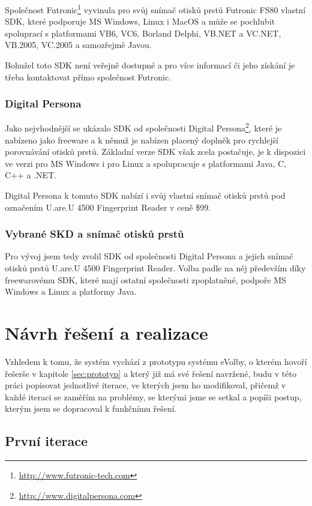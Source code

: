 \documentclass[11pt,twoside,a4paper]{book}
\begin{document}
Společnost Futronic\footnote{\url{http://www.futronic-tech.com}} vyvinula pro svůj snímač otisků prstů Futronic FS80 vlastní SDK, které podporuje MS Windows, Linux i MacOS a může se pochlubit spoluprací s platformami VB6, VC6, Borland Delphi, VB.NET a VC.NET, VB.2005, VC.2005 a samozřejmě Javou.

Bohužel toto SDK není veřejně dostupné a pro více informací či jeho získání je třeba kontaktovat přímo společnost Futronic. 

\subsection{Digital Persona}

Jako nejvhodnější se ukázalo SDK od společnosti Digital Persona\footnote{\url{http://www.digitalpersona.com}}, které je nabízeno jako freeware a k němuž je nabízen placený doplněk pro rychlejší porovnávání otisků prstů. Základní verze SDK však zcela postačuje, je k dispozici ve verzi pro MS Windows i pro Linux a spolupracuje s platformami Java, C, C++ a .NET.

Digital Persona k tomuto SDK nabízí i svůj vlastní snímač otisků prstů pod označením U.are.U 4500 Fingerprint Reader v ceně \$99.

\subsection{Vybrané SKD a snímač otisků prstů}

Pro vývoj jsem tedy zvolil SDK od společnosti Digital Persona a jejich snímač otisků prstů U.are.U 4500 Fingerprint Reader. Volba padle na něj především díky freewarovému SDK, které mají ostatní společnosti zpoplatněné, podpoře MS Windows a Linux a platformy Java.

\chapter{Návrh řešení a realizace}

Vzhledem k tomu, že systém vychází z prototypu systému eVolby, o kterém hovoří řešerše v kapitole \ref{sec:prototyp} a který již má své řešení navržené, budu v této práci popisovat jednotlivé iterace, ve kterých jsem ho modifikoval, přičemž v každé iteraci se zaměřím na problémy, se kterými jsme se setkal a popíši postup, kterým jsem se dopracoval k funkčnímu řešení. 

\section{První iterace} \label{sec:iterace:prvni}
\end{document}
